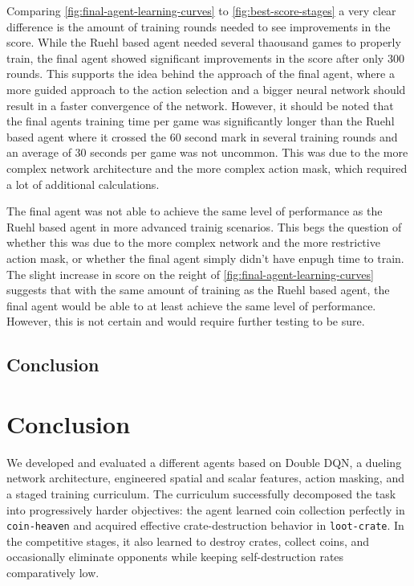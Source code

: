 \documentclass[11pt,a4paper]{article}
\begin{document}
Comparing \ref{fig:final-agent-learning-curves} to \ref{fig:best-score-stages} a very clear difference is the amount of training rounds needed to see improvements in the score. While the Ruehl based agent needed several thaousand games to properly train, the final agent showed significant improvements in the score after only 300 rounds. This supports the idea behind the approach of the final agent, where a more guided approach to the action selection and a bigger neural network should result in a faster convergence of the network.
However, it should be noted that the final agents training time per game was significantly longer than the Ruehl based agent where it crossed the 60 second mark in several training rounds and an average of 30 seconds per game was not uncommon. This was due to the more complex network architecture and the more complex action mask, which required a lot of additional calculations.

The final agent was not able to achieve the same level of performance as the Ruehl based agent in more advanced trainig scenarios. This begs the question of whether this was due to the more complex network and the more restrictive action mask, or whether the final agent simply didn't have enpugh time to train. The slight increase in score on the reight of \ref{fig:final-agent-learning-curves} suggests that with the same amount of training as the Ruehl based agent, the final agent would be able to at least achieve the same level of performance. However, this is not certain and would require further testing to be sure.



\subsection{Conclusion}
\section{Conclusion}

We developed and evaluated a different agents based on Double DQN, a dueling network architecture, engineered spatial and scalar features, action masking, and a staged training curriculum. 
The curriculum successfully decomposed the task into progressively harder objectives: the agent learned coin collection perfectly in \texttt{coin-heaven} and acquired effective crate-destruction behavior in \texttt{loot-crate}. 
In the competitive stages, it also learned to destroy crates, collect coins, and occasionally eliminate opponents while keeping self-destruction rates comparatively low.
\end{document}
